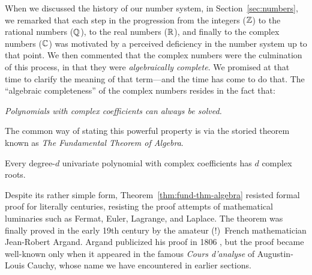 When we discussed the history of our number system, in
Section~\ref{sec:numbers}, we remarked that each step in the
progression from the integers ($\mathbb{Z}$) to the rational numbers ($\mathbb{Q}$),
to the real numbers ($\mathbb{R}$), and finally to the complex numbers ($\mathbb{C}$)
was motivated by a perceived deficiency in the number system up to
that point.  We then commented that the complex numbers were the
culmination of this process, in that they were {\it algebraically
  complete}.   We promised at that time
to clarify the meaning of that term---and the time has come to do
that.  The ``algebraic completeness'' of the complex numbers resides
in the fact that:

{\em Polynomials with complex coefficients can always be solved.}

\noindent
The common way of stating this powerful property is via the storied
theorem known as {\it The Fundamental Theorem of Algebra}.

\begin{theorem}
\label{thm:fund-thm-algebra}
Every degree-$d$ univariate polynomial with complex coefficients has
$d$ complex roots.
\end{theorem}

Despite its rather simple form, Theorem~\ref{thm:fund-thm-algebra}
resisted formal proof for literally centuries, resisting the proof
attempts of mathematical luminaries such as Fermat, 
 Euler,  Lagrange,
 and Laplace.
The theorem was finally proved in the early 19th century by the
amateur (!)~French mathematician Jean-Robert Argand.
Argand publicized his proof in 1806 \cite{Argand}, but the proof
became well-known only when it appeared in the famous {\it Cours
  d'analyse} \cite{Cauchy21} of Augustin-Louis Cauchy,
whose name we have encountered in earlier sections.

\medskip

